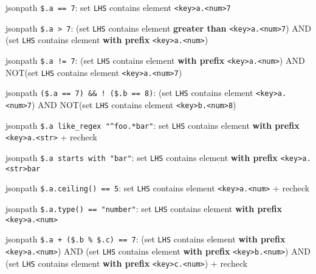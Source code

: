\documentclass[11pt]{article}
\begin{document}
\begin{oparts}
  \begin{oparts}
  \item
    jsonpath \texttt{\$.a\ ==\ 7}: set \texttt{LHS} contains element
    \texttt{\textless{}key\textgreater{}a.\textless{}num\textgreater{}7}
  \item
    jsonpath \texttt{\$.a\ \textgreater{}\ 7}: (set \texttt{LHS}
    contains element \textbf{greater than}
    \texttt{\textless{}key\textgreater{}a.\textless{}num\textgreater{}7})
    AND (set \texttt{LHS} contains element \textbf{with prefix}
    \texttt{\textless{}key\textgreater{}a.\textless{}num\textgreater{}})
  \item
    jsonpath \texttt{\$.a\ !=\ 7}: (set \texttt{LHS} contains element
    \textbf{with prefix}
    \texttt{\textless{}key\textgreater{}a.\textless{}num\textgreater{}})
    AND NOT(set \texttt{LHS} contains element
    \texttt{\textless{}key\textgreater{}a.\textless{}num\textgreater{}7})
  \item
    jsonpath \texttt{(\$.a\ ==\ 7)\ \&\&\ !\ (\$.b\ ==\ 8)}: (set
    \texttt{LHS} contains element
    \texttt{\textless{}key\textgreater{}a.\textless{}num\textgreater{}7})
    AND NOT(set \texttt{LHS} contains element
    \texttt{\textless{}key\textgreater{}b.\textless{}num\textgreater{}8})
  \item
    jsonpath \texttt{\$.a\ like\_regex\ "\^{}foo.*bar"}: set
    \texttt{LHS} contains element \textbf{with prefix}
    \texttt{\textless{}key\textgreater{}a.\textless{}str\textgreater{}}
    + recheck
  \item
    jsonpath \texttt{\$.a\ starts\ with\ "bar"}: set \texttt{LHS}
    contains element \textbf{with prefix}
    \texttt{\textless{}key\textgreater{}a.\textless{}str\textgreater{}bar}
  \item
    jsonpath \texttt{\$.a.ceiling()\ ==\ 5}: set \texttt{LHS} contains
    element
    \texttt{\textless{}key\textgreater{}a.\textless{}num\textgreater{}}
    + recheck
  \item
    jsonpath \texttt{\$.a.type()\ ==\ "number"}: set \texttt{LHS}
    contains element \textbf{with prefix}
    \texttt{\textless{}key\textgreater{}a.\textless{}num\textgreater{}}
  \item
    jsonpath \texttt{\$.a\ +\ (\$.b\ \%\ \$.c)\ ==\ 7}: (set
    \texttt{LHS} contains element \textbf{with prefix}
    \texttt{\textless{}key\textgreater{}a.\textless{}num\textgreater{}})
    AND (set \texttt{LHS} contains element \textbf{with prefix}
    \texttt{\textless{}key\textgreater{}b.\textless{}num\textgreater{}})
    AND (set \texttt{LHS} contains element \textbf{with prefix}
    \texttt{\textless{}key\textgreater{}c.\textless{}num\textgreater{}})
    + recheck
  \end{oparts}
\end{oparts}
\end{document}
